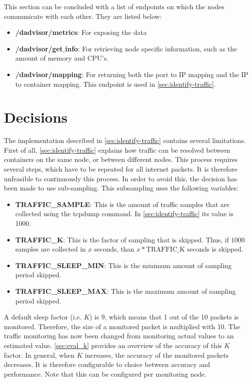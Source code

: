 \noindent
This section can be concluded with a list of endpoints on which the nodes communicate with each other. They are listed below:
\begin{itemize}
    \item \textbf{/dadvisor/metrics}: For exposing the data
    \item \textbf{/dadvisor/get$\_$info}: For retrieving node specific information, such as the amount of memory and CPU's.
    \item \textbf{/dadvisor/mapping}: For returning both the port to IP mapping and the IP to container mapping. This endpoint is used in \autoref{sec:identify-traffic}.
\end{itemize}

\section{Decisions} \label{sec:decisions}
The implementation described in \autoref{sec:identify-traffic} contains several limitations. First of all, \autoref{sec:identify-traffic} explains how traffic can be resolved between containers on the same node, or between different nodes. This process requires several steps, which have to be repeated for all internet packets. It is therefore unfeasible to continuously this process. In order to avoid this, the decision has been made to use sub-sampling. This subsampling uses the following variables:

\begin{itemize}
    \item \textbf{TRAFFIC\_SAMPLE}: This is the amount of traffic samples that are collected using the tcpdump command. In \autoref{sec:identify-traffic} its value is 1000.
    \item \textbf{TRAFFIC\_K}: This is the factor of sampling that is skipped. Thus, if $1000$ samples are collected in $x$ seconds, than $x * \text{TRAFFIC\_K}$ seconds is skipped.
    \item \textbf{TRAFFIC\_SLEEP\_MIN}: This is the minimum amount of sampling period skipped.
    \item \textbf{TRAFFIC\_SLEEP\_MAX}: This is the maximum amount of sampling period skipped.
\end{itemize}

\noindent
A default sleep factor (i.e. $K$) is 9, which means that 1 out of the 10 packets is monitored. Therefore, the size of a monitored packet is multiplied with 10. The traffic monitoring has now been changed from monitoring actual values to an estimated value. \autoref{sec:eval_k} provides an overview of the accuracy of this $K$ factor. In general, when $K$ increases, the accuracy of the monitored packets decreases. It is therefore configurable to choice between accuracy and performance. Note that this can be configured per monitoring node.\\

